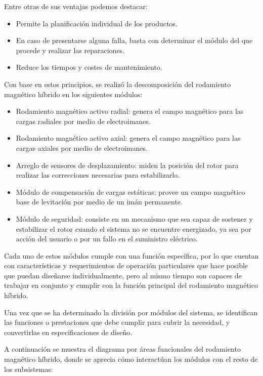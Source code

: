Entre otras de sus ventajas podemos destacar:

\begin{itemize}[noitemsep]
\item Permite la planificación individual de los productos.
\item En caso de presentarse alguna falla, basta con determinar el módulo del que procede y realizar las reparaciones. 
\item Reduce los tiempos y costes de mantenimiento.
\end{itemize}

Con base en estos principios, se realizó la descomposición del rodamiento magnético híbrido en los siguientes módulos:

\begin{itemize}
\item Rodamiento magnético activo radial: genera el campo magnético para las cargas radiales por medio de electroimanes. 
\item Rodamiento magnético activo axial: genera el campo magnético para las cargas axiales por medio de electroimanes.
\item Arreglo de sensores de desplazamiento: miden la posición del rotor para realizar las correcciones necesarias para estabilizarlo. 
\item Módulo de compensación de cargas estáticas: provee un campo magnético base de levitación por medio de un imán permanente. 
\item Módulo de seguridad: consiste en un mecanismo que sea capaz de sostener y estabilizar el rotor cuando el sistema no se encuentre energizado, ya sea por acción del usuario o por un fallo en el suministro eléctrico. 
\end{itemize}

Cada uno de estos módulos cumple con una función específica, por lo que cuentan con características y requerimientos de operación particulares que hace posible que puedan diseñarse individualmente, pero al mismo tiempo son capaces de trabajar en conjunto y cumplir con la función principal del rodamiento magnético híbrido. 

Una vez que se ha determinado la división por módulos del sistema, se identifican las funciones o prestaciones que debe cumplir para cubrir la necesidad, y convertirlas en especificaciones de diseño.

A continuación se muestra el diagrama por áreas funcionales del rodamiento magnético híbrido, donde se aprecia cómo interactúan los módulos con el resto de los subsistemas:

